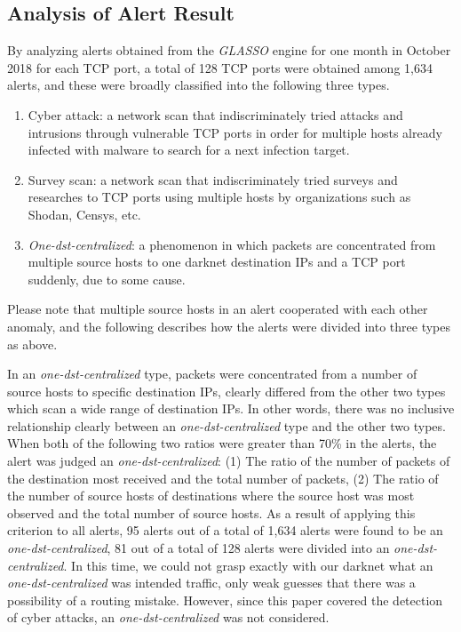 \documentclass[conference]{IEEEtran}
\begin{document}
\subsection{Analysis of Alert Result}
By analyzing alerts obtained from the {\it GLASSO} engine for one month in October 2018 for each TCP port, a total of 128 TCP ports were obtained among 1,634 alerts, and these were broadly classified into the following three types.
\begin{enumerate}
  \item Cyber attack: a network scan that indiscriminately tried attacks and intrusions through vulnerable TCP ports in order for multiple hosts already infected with malware to search for a next infection target.
  \item Survey scan: a network scan that indiscriminately tried surveys and researches to TCP ports using multiple hosts by organizations such as Shodan, Censys, etc.
  \item {\it One-dst-centralized}: a phenomenon in which packets are concentrated from multiple source hosts to one darknet destination IPs and a TCP port suddenly, due to some cause.
\end{enumerate}
Please note that multiple source hosts in an alert cooperated with each other anomaly, and the following describes how the alerts were divided into three types as above.


In an {\it one-dst-centralized} type, packets were concentrated from a number of source hosts to specific destination IPs, clearly differed from the other two types which scan a wide range of destination IPs.
In other words, there was no inclusive relationship clearly between an {\it one-dst-centralized} type and the other two types.
When both of the following two ratios were greater than 70\% in the alerts, the alert was judged an {\it one-dst-centralized}: (1) The ratio of the number of packets of the destination most received and the total number of packets, (2) The ratio of the number of source hosts of destinations where the source host was most observed and the total number of source hosts.
As a result of applying this criterion to all alerts, 95 alerts out of a total of 1,634 alerts were found to be an {\it one-dst-centralized}, 81 out of a total of 128 alerts were divided into an {\it one-dst-centralized}.
In this time, we could not grasp exactly with our darknet what an {\it one-dst-centralized} was intended traffic, only weak guesses that there was a possibility of a routing mistake.
However, since this paper covered the detection of cyber attacks, an {\it one-dst-centralized} was not considered.
\end{document}
